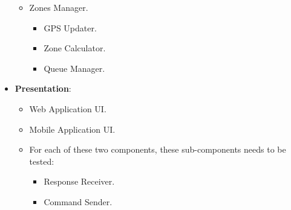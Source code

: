\documentclass[../../../../testPlan.tex]{subfiles}
\begin{document}
\begin{itemize}
\begin{itemize}
			      	\item Zones Manager.
			      		  \begin{itemize}
			      		  	\item GPS Updater.
			      		  	\item Zone Calculator.
			      		  	\item Queue Manager.
			      		  \end{itemize}
			      \end{itemize}
			\item \textbf{Presentation}:
			      \begin{itemize}
			      	\item Web Application UI.
			      	\item Mobile Application UI.
			      	\item For each of these two components, these sub-components needs to be tested:
			      		  \begin{itemize}
			      	      	\item Response Receiver.
			      	      	\item Command Sender.
			      		  \end{itemize}
			      \end{itemize}
		\end{itemize}
\end{document}

